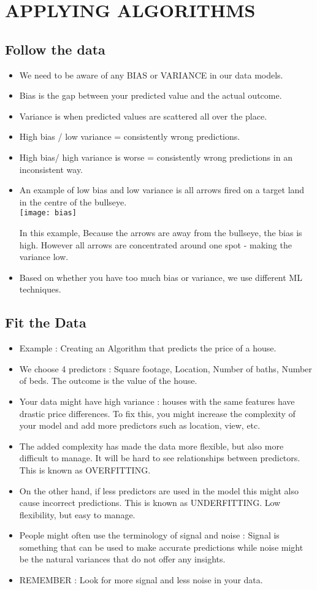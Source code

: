 \documentclass[11pt, oneside]{article}   	%
\begin{document}
\section{APPLYING ALGORITHMS}
\subsection{Follow the data}
\begin{itemize}
\item We need to be aware of any BIAS or VARIANCE in our data models.
\item Bias is the gap between your predicted value and the actual outcome.
\item Variance is when predicted values are scattered all over the place.
\item High bias / low variance = consistently wrong predictions.
\item High bias/ high variance is worse = consistently wrong predictions in an inconsistent way.
\item An example of low bias and low variance is all arrows fired on a target land in the centre of the bullseye.
\bigskip \\
\texttt{[image: bias]}
\bigskip \\
\begin{center} In this example, Because the arrows are away from the bullseye, the bias is high. However all arrows are concentrated around one spot - making the variance low.
\end{center}
\item Based on whether you have too much bias or variance, we use different ML techniques.
\end{itemize}
\subsection{Fit the Data}
\begin{itemize}
\item Example : Creating an Algorithm that predicts the price of a house.
\item We choose 4 predictors : Square footage, Location, Number of baths, Number of beds. The outcome is the value of the house.
\item Your data might have high variance : houses with the same features have drastic price differences. To fix this, you might increase the complexity of your model and add more predictors such as location, view, etc.
\item The added complexity has made the data more flexible, but also more difficult to manage. It will be hard to see relationships between predictors. This is known as OVERFITTING.
\item On the other hand, if less predictors are used in the model this might also cause incorrect predictions. This is known as UNDERFITTING. Low flexibility, but easy to manage.
\item People might often use the terminology of signal and noise : Signal is something that can be used to make accurate predictions while noise might be the natural variances that do not offer any insights.
\item REMEMBER : Look for more signal and less noise in your data.
\end{itemize} 
\end{document}

